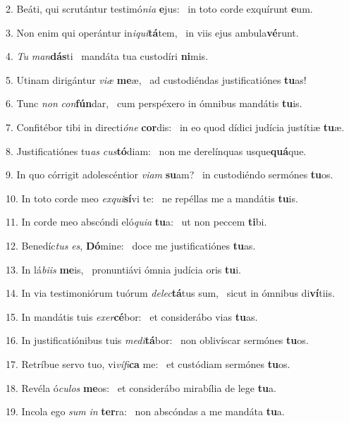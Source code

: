 2. Beáti, qui scrutántur testimó\textit{ni}\textit{a} \textbf{e}jus: \ast\  in toto corde exquírunt \textbf{e}um.\

3. Non enim qui operántur in\textit{i}\textit{qui}\textbf{tá}tem, \ast\  in viis ejus ambula\textbf{vé}runt.\

4. \textit{Tu} \textit{man}\textbf{dás}ti \ast\  mandáta tua custodíri \textbf{ni}mis.\

5. Utinam dirigántur \textit{vi}\textit{æ} \textbf{me}æ, \ast\  ad custodiéndas justificatiónes \textbf{tu}as!\

6. Tunc \textit{non} \textit{con}\textbf{fún}dar, \ast\  cum perspéxero in ómnibus mandátis \textbf{tu}is.\

7. Confitébor tibi in directi\textit{ó}\textit{ne} \textbf{cor}dis: \ast\  in eo quod dídici judícia justítiæ \textbf{tu}æ.\

8. Justificatiónes tu\textit{as} \textit{cus}\textbf{tó}diam: \ast\  non me derelínquas usque\textbf{quá}que.\

9. In quo córrigit adolescéntior \textit{vi}\textit{am} \textbf{su}am? \ast\  in custodiéndo sermónes \textbf{tu}os.\

10. In toto corde meo \textit{ex}\textit{qui}\textbf{sí}vi te: \ast\  ne repéllas me a mandátis \textbf{tu}is.\

11. In corde meo abscóndi eló\textit{qui}\textit{a} \textbf{tu}a: \ast\  ut non peccem \textbf{ti}bi.\

12. Benedíc\textit{tus} \textit{es}, \textbf{Dó}mine: \ast\  doce me justificatiónes \textbf{tu}as.\

13. In lá\textit{bi}\textit{is} \textbf{me}is, \ast\  pronuntiávi ómnia judícia oris \textbf{tu}i.\

14. In via testimoniórum tuórum \textit{de}\textit{lec}\textbf{tá}tus sum, \ast\  sicut in ómnibus di\textbf{ví}tiis.\

15. In mandátis tuis \textit{ex}\textit{er}\textbf{cé}bor: \ast\  et considerábo vias \textbf{tu}as.\

16. In justificatiónibus tuis \textit{me}\textit{di}\textbf{tá}bor: \ast\  non oblivíscar sermónes \textbf{tu}os.\

17. Retríbue servo tuo, vi\textit{ví}\textit{fi}\textbf{ca} me: \ast\  et custódiam sermónes \textbf{tu}os.\

18. Revéla ó\textit{cu}\textit{los} \textbf{me}os: \ast\  et considerábo mirabília de lege \textbf{tu}a.\

19. Incola ego \textit{sum} \textit{in} \textbf{ter}ra: \ast\  non abscóndas a me mandáta \textbf{tu}a.\

